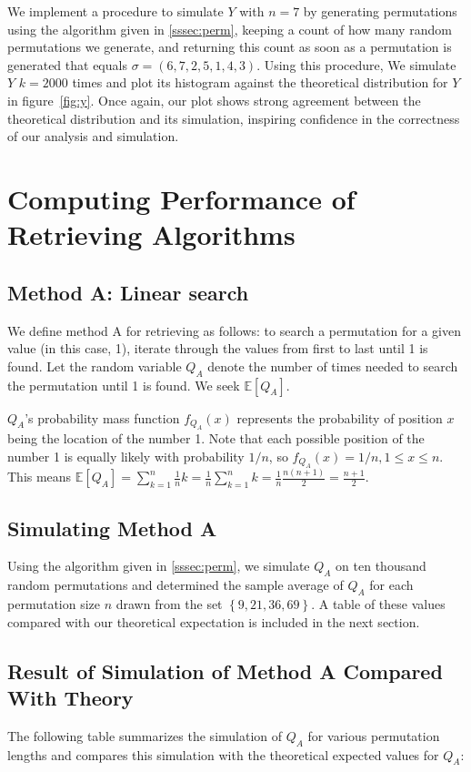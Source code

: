 \documentclass[11pt, oneside]{article}   	%
\begin{document}
We implement a procedure to simulate $Y$ with $n = 7$ by generating permutations using the algorithm given in \ref{sssec:perm}, keeping a count of how many random permutations we generate, and returning this count as soon as a permutation is generated that equals $\sigma = (6, 7, 2, 5, 1, 4, 3)$. Using this procedure, We simulate $Y$ $k = 2000$ times and plot its histogram against the theoretical distribution for $Y$ in figure~\ref{fig:y}. Once again, our plot shows strong agreement between the theoretical distribution and its simulation, inspiring confidence in the correctness of our analysis and simulation.

\section{Computing Performance of Retrieving Algorithms}
\subsection{Method A: Linear search}
We define method A for retrieving as follows: to search a permutation for a given value (in this case, 1), iterate through the values from first to last until 1 is found. Let the random variable $Q_A$ denote the number of times needed to search the permutation until 1 is found. We seek $\mathbb{E}[Q_A]$.

$Q_A$'s probability mass function $f_{Q_A}(x)$ represents the probability of position $x$ being the location of the number 1. Note that each possible position of the number 1 is equally likely with probability $1 / n$, so $f_{Q_A}(x) = 1 / n, 1 \leq x \leq n$. This means $\mathbb{E}[Q_A] = \sum_{k=1}^{n} \frac{1}{n} k = \frac{1}{n} \sum_{k = 1}^{n} k = \frac{1}{n} \frac{n (n + 1)}{2} = \frac{n + 1}{2}$.
\subsection{Simulating Method A}
Using the algorithm given in \ref{sssec:perm}, we simulate $Q_A$ on ten thousand random permutations and determined the sample average of $Q_A$ for each permutation size $n$ drawn from the set $\left\{9, 21, 36, 69\right\}$. A table of these values compared with our theoretical expectation is included in the next section.

\subsection{Result of Simulation of Method A Compared With Theory}
The following table summarizes the simulation of $Q_{A}$ for various permutation lengths and compares this simulation with the theoretical expected values for $Q_{A}$:\\
\end{document}
